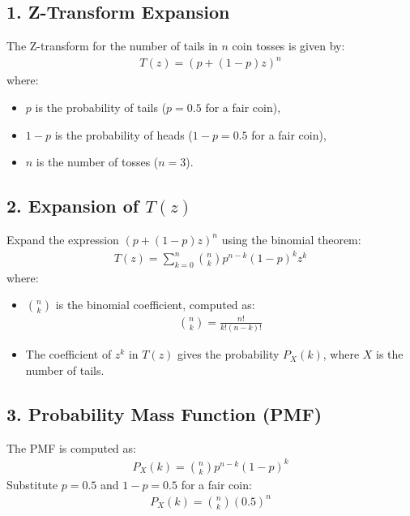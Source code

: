 \documentclass[journal]{IEEEtran}
\begin{document}
\subsection*{1. Z-Transform Expansion}
The Z-transform for the number of tails in \(n\) coin tosses is given by:
\begin{align}
T(z) = \left( p + (1-p)z \right)^n
\end{align}
where:
\begin{itemize}
    \item \(p\) is the probability of tails (\(p = 0.5\) for a fair coin),
    \item \(1-p\) is the probability of heads (\(1-p = 0.5\) for a fair coin),
    \item \(n\) is the number of tosses (\(n = 3\)).
\end{itemize}

\subsection*{2. Expansion of \(T(z)\)}
Expand the expression \(\left( p + (1-p)z \right)^n\) using the binomial theorem:
\begin{align}
T(z) = \sum_{k=0}^{n} \binom{n}{k} p^{n-k} (1-p)^k z^k
\end{align}
where:
\begin{itemize}
    \item \(\binom{n}{k}\) is the binomial coefficient, computed as:
    \begin{align}
    \binom{n}{k} = \frac{n!}{k! (n-k)!}
    \end{align}
    \item The coefficient of \(z^k\) in \(T(z)\) gives the probability \(P_X(k)\), where \(X\) is the number of tails.
\end{itemize}

\subsection*{3. Probability Mass Function (PMF)}
The PMF is computed as:
\begin{align}
P_X(k) = \binom{n}{k} p^{n-k} (1-p)^k
\end{align}
Substitute \(p = 0.5\) and \(1-p = 0.5\) for a fair coin:
\begin{align}
P_X(k) = \binom{n}{k} (0.5)^n
\end{align}
\end{document}
